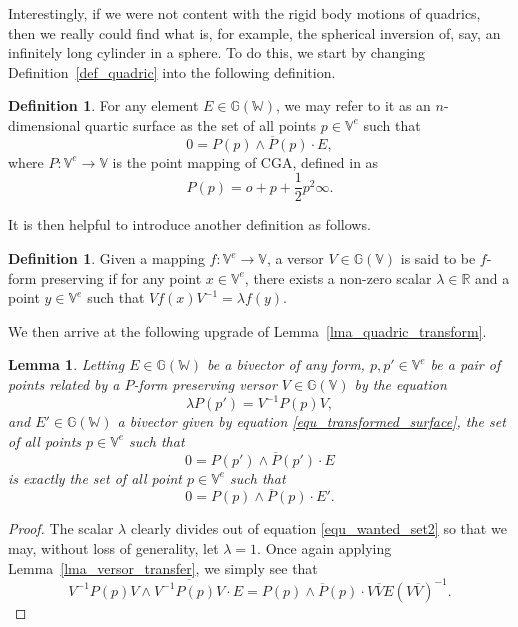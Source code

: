 \documentclass{birkjour}
\newtheorem{lem}[thm]{Lemma}
\theoremstyle{definition}
\newtheorem{defn}[thm]{Definition}
\theoremstyle{remark}
\numberwithin{equation}{section}
\newcommand{\G}{\mathbb{G}}
\newcommand{\V}{\mathbb{V}}
\newcommand{\W}{\mathbb{W}}
\newcommand{\R}{\mathbb{R}}
\newcommand{\nvao}{o}
\newcommand{\nvai}{\infty}
\begin{document}
Interestingly, if we were not content with the rigid body motions of
quadrics, then we really could find what is, for example, the spherical
inversion of, say, an infinitely long cylinder in a sphere.  To do this, we start by changing
Definition~\ref{def_quadric} into the following definition.
\begin{defn}\label{def_surface}
For any element $E\in\G(\W)$, we may refer to it as an $n$-dimensional
quartic surface as the set of all points $p\in\V^e$ such that
\begin{equation}\label{equ_surface_set}
0 = P(p)\wedge\overline{P}(p)\cdot E,
\end{equation}
where $P:\V^e\to\V$ is the point mapping of CGA, defined in \cite{Hestenes01} as
\begin{equation}\label{equ_cga_point_map}
P(p) = \nvao + p + \frac{1}{2}p^2\nvai.
\end{equation}
\end{defn}
It is then helpful to introduce another definition as follows.
\begin{defn}\label{def_preserve_point_map}
Given a mapping $f:\V^e\to\V$, a versor $V\in\G(\V)$ is said to be $f$-form preserving if for
any point $x\in\V^e$, there exists a non-zero scalar $\lambda\in\R$ and
a point $y\in\V^e$ such that $Vf(x)V^{-1}=\lambda f(y)$.
\end{defn}
We then arrive at the following upgrade of Lemma~\ref{lma_quadric_transform}.
\begin{lem}\label{lma_quartic_transform}
Letting $E\in\G(\W)$ be a bivector of any form, $p,p'\in\V^e$ be
a pair of points related by a $P$-form preserving versor $V\in\G(\V)$ by
the equation
\begin{equation}
\lambda P(p') = V^{-1}P(p)V,
\end{equation}
and $E'\in\G(\W)$ a bivector given by equation \eqref{equ_transformed_surface},
the set of all points $p\in\V^e$ such that
\begin{equation}\label{equ_wanted_set2}
0 = P(p')\wedge\overline{P}(p')\cdot E
\end{equation}
is exactly the set of all point $p\in\V^e$ such that
\begin{equation}
0 = P(p)\wedge\overline{P}(p)\cdot E'.
\end{equation}
\end{lem}
\begin{proof}
The scalar $\lambda$ clearly divides out of equation \eqref{equ_wanted_set2} so that we may,
without loss of generality, let $\lambda=1$.
Once again applying Lemma~\ref{lma_versor_transfer}, we simply see that
\begin{equation}
V^{-1}P(p)V\wedge\overline{V^{-1}P(p)V}\cdot E = P(p)\wedge\overline{P}(p)\cdot V\overline{V}E(V\overline{V})^{-1}.
\end{equation}
\end{proof}
\end{document}
